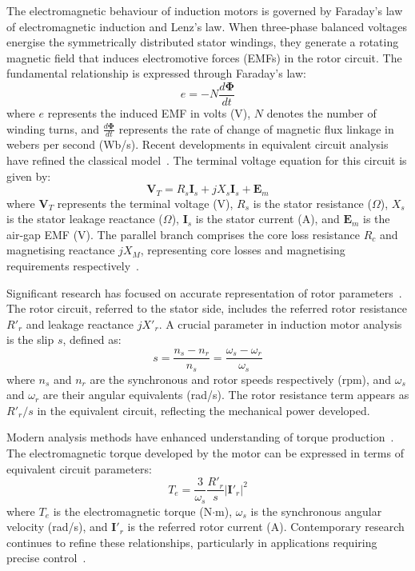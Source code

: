 \documentclass[a4paper,12pt]{article}
\begin{document}
The electromagnetic behaviour of induction motors is governed by Faraday's law of electromagnetic induction and Lenz's law. When three-phase balanced voltages energise the symmetrically distributed stator windings, they generate a rotating magnetic field that induces electromotive forces (EMFs) in the rotor circuit. The fundamental relationship is expressed through Faraday's law:
\begin{equation}
    e = -N\frac{d\boldsymbol{\Phi}}{dt}
    \label{eq:faraday}
\end{equation}
where $e$ represents the induced EMF in volts (V), $N$ denotes the number of winding turns, and $\frac{d\boldsymbol{\Phi}}{dt}$ represents the rate of change of magnetic flux linkage in webers per second (Wb/s). Recent developments in equivalent circuit analysis have refined the classical model~\citep{krause2013}. 
The terminal voltage equation for this circuit is given by:
\begin{equation}
    \mathbf{V}_T = R_s\mathbf{I}_s + jX_s\mathbf{I}_s + \mathbf{E}_m
    \label{eq:voltage}
\end{equation}
where $\mathbf{V}_T$ represents the terminal voltage (V), $R_s$ is the stator resistance ($\Omega$), $X_s$ is the stator leakage reactance ($\Omega$), $\mathbf{I}_s$ is the stator current (A), and $\mathbf{E}_m$ is the air-gap EMF (V). The parallel branch comprises the core loss resistance $R_c$ and magnetising reactance $jX_M$, representing core losses and magnetising requirements respectively~\citep{sen2021}.

Significant research has focused on accurate representation of rotor parameters~\citep{boldea2021}. The rotor circuit, referred to the stator side, includes the referred rotor resistance $R'_r$ and leakage reactance $jX'_r$. A crucial parameter in induction motor analysis is the slip $s$, defined as:
\begin{equation}
    s = \frac{n_s - n_r}{n_s} = \frac{\omega_s - \omega_r}{\omega_s}
    \label{eq:slip}
\end{equation}
where $n_s$ and $n_r$ are the synchronous and rotor speeds respectively (rpm), and $\omega_s$ and $\omega_r$ are their angular equivalents (rad/s). The rotor resistance term appears as $R'_r/s$ in the equivalent circuit, reflecting the mechanical power developed.

Modern analysis methods have enhanced understanding of torque production~\citep{vas2019}. The electromagnetic torque developed by the motor can be expressed in terms of equivalent circuit parameters:
\begin{equation}
    T_e = \frac{3}{\omega_s}\frac{R'_r}{s}|\mathbf{I}'_r|^2
    \label{eq:torque}
\end{equation}
where $T_e$ is the electromagnetic torque (N$\cdot$m), $\omega_s$ is the synchronous angular velocity (rad/s), and $\mathbf{I}'_r$ is the referred rotor current (A). Contemporary research continues to refine these relationships, particularly in applications requiring precise control~\citep{bose2020}.
 
\end{document}
